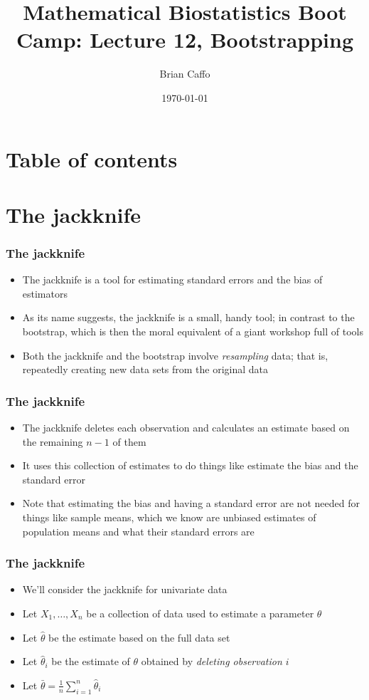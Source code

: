 \documentclass[aspectratio=169]{beamer}
\title{Mathematical Biostatistics Boot Camp: Lecture 12, Bootstrapping}
\author{Brian Caffo}
\date{\today}
\institute[Department of Biostatistics]{
  Department of Biostatistics \\
  Johns Hopkins Bloomberg School of Public Health\\
  Johns Hopkins University
}
\begin{document}
\frame{\titlepage}


\section{Table of contents}

\section{The jackknife}
\begin{frame}\frametitle{The jackknife}
\begin{itemize}
\item The jackknife is a tool for estimating standard errors 
  and the bias of estimators 
\item As its name suggests, the jackknife is a small, handy tool; in contrast to
  the bootstrap, which is then the moral equivalent of a
  giant workshop full of tools
\item Both the jackknife and the bootstrap involve {\em resampling}
  data; that is, repeatedly creating new data sets from the original
  data
\end{itemize}
\end{frame}

\begin{frame}\frametitle{The jackknife}
  \begin{itemize}
\item The jackknife deletes each observation and calculates an estimate
  based on the remaining $n-1$ of them
\item It uses this collection of estimates to do things like estimate
  the bias and the standard error
\item Note that estimating the bias and having a standard error are
  not needed for things like sample means, which we know are unbiased
  estimates of population means and what their standard errors are
  \end{itemize}
\end{frame}

\begin{frame}\frametitle{The jackknife}
  \begin{itemize}
  \item We'll consider the jackknife for univariate data
  \item Let $X_1,\ldots,X_n$ be a collection of data used to estimate
    a parameter $\theta$
  \item Let $\hat \theta$ be the estimate based on the full data set
  \item Let $\hat \theta_{i}$ be the estimate of $\theta$ obtained by
    {\em deleting observation $i$}
  \item Let $\bar \theta = \frac{1}{n}\sum_{i=1}^n \hat \theta_{i}$
  \end{itemize}  
\end{frame}
\end{document}
